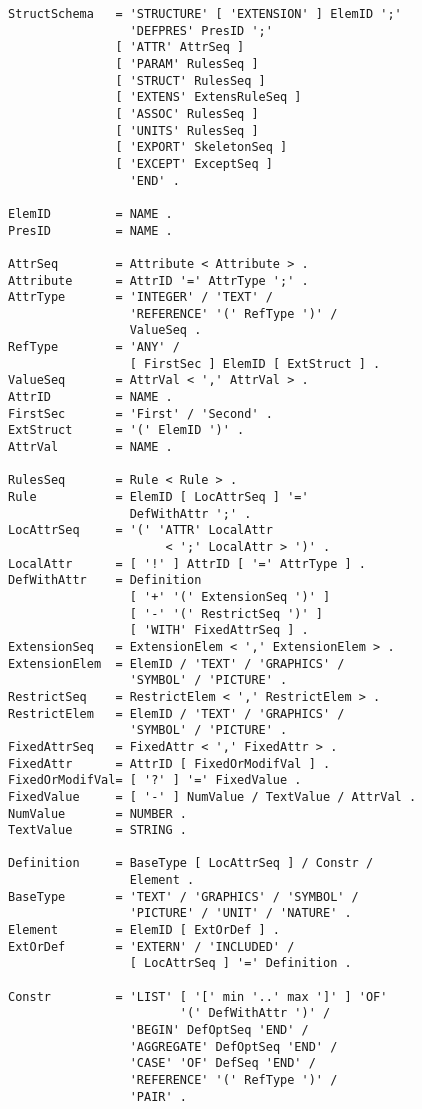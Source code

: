 \begin{verbatim}
StructSchema   = 'STRUCTURE' [ 'EXTENSION' ] ElemID ';'
                 'DEFPRES' PresID ';'
               [ 'ATTR' AttrSeq ]
               [ 'PARAM' RulesSeq ]
               [ 'STRUCT' RulesSeq ]
               [ 'EXTENS' ExtensRuleSeq ]
               [ 'ASSOC' RulesSeq ]
               [ 'UNITS' RulesSeq ]
               [ 'EXPORT' SkeletonSeq ]
               [ 'EXCEPT' ExceptSeq ]
                 'END' .

ElemID         = NAME .
PresID         = NAME .

AttrSeq        = Attribute < Attribute > .
Attribute      = AttrID '=' AttrType ';' .
AttrType       = 'INTEGER' / 'TEXT' /
                 'REFERENCE' '(' RefType ')' /
                 ValueSeq .
RefType        = 'ANY' /
                 [ FirstSec ] ElemID [ ExtStruct ] .
ValueSeq       = AttrVal < ',' AttrVal > .
AttrID         = NAME .
FirstSec       = 'First' / 'Second' .
ExtStruct      = '(' ElemID ')' .
AttrVal        = NAME .

RulesSeq       = Rule < Rule > .
Rule           = ElemID [ LocAttrSeq ] '='
                 DefWithAttr ';' .
LocAttrSeq     = '(' 'ATTR' LocalAttr
                      < ';' LocalAttr > ')' .
LocalAttr      = [ '!' ] AttrID [ '=' AttrType ] .
DefWithAttr    = Definition
                 [ '+' '(' ExtensionSeq ')' ]
                 [ '-' '(' RestrictSeq ')' ]
                 [ 'WITH' FixedAttrSeq ] .
ExtensionSeq   = ExtensionElem < ',' ExtensionElem > .
ExtensionElem  = ElemID / 'TEXT' / 'GRAPHICS' /
                 'SYMBOL' / 'PICTURE' .
RestrictSeq    = RestrictElem < ',' RestrictElem > .
RestrictElem   = ElemID / 'TEXT' / 'GRAPHICS' /
                 'SYMBOL' / 'PICTURE' .
FixedAttrSeq   = FixedAttr < ',' FixedAttr > .
FixedAttr      = AttrID [ FixedOrModifVal ] .
FixedOrModifVal= [ '?' ] '=' FixedValue .
FixedValue     = [ '-' ] NumValue / TextValue / AttrVal .
NumValue       = NUMBER .
TextValue      = STRING .

Definition     = BaseType [ LocAttrSeq ] / Constr /
                 Element .
BaseType       = 'TEXT' / 'GRAPHICS' / 'SYMBOL' /
                 'PICTURE' / 'UNIT' / 'NATURE' .
Element        = ElemID [ ExtOrDef ] .
ExtOrDef       = 'EXTERN' / 'INCLUDED' /
                 [ LocAttrSeq ] '=' Definition .

Constr         = 'LIST' [ '[' min '..' max ']' ] 'OF'
                        '(' DefWithAttr ')' /
                 'BEGIN' DefOptSeq 'END' /
                 'AGGREGATE' DefOptSeq 'END' /
                 'CASE' 'OF' DefSeq 'END' /
                 'REFERENCE' '(' RefType ')' /
                 'PAIR' .


\end{verbatim}
